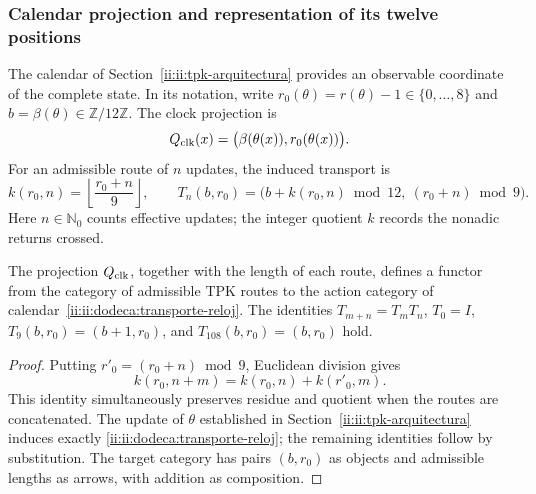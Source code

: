 \subsubsection{Calendar projection and representation of its twelve positions}
\label{ii:ii:dodeca:calendario}
The calendar of Section~\ref{ii:ii:tpk-arquitectura} provides an
observable coordinate of the complete state. In its notation, write
\(r_0(\theta)=r(\theta)-1\in\{0,\ldots,8\}\) and
\(b=\beta(\theta)\in\mathbb Z/12\mathbb Z\). The clock projection is
\[
 Q_{\rm clk}(x)=\bigl(\beta(\theta(x)),r_0(\theta(x))\bigr).
\]
For an admissible route of \(n\) updates, the induced transport is
\begin{equation}
 k(r_0,n)=\left\lfloor\frac{r_0+n}{9}\right\rfloor,
 \qquad
 T_n(b,r_0)=\bigl(b+k(r_0,n)\bmod12,\ (r_0+n)\bmod9\bigr).
 \label{ii:ii:dodeca:transporte-reloj}
\end{equation}
Here \(n\in\mathbb N_0\) counts effective updates; the integer
quotient \(k\) records the nonadic returns crossed.

\begin{proposition}
\label{ii:ii:dodeca:composicion}
The projection \(Q_{\rm clk}\), together with the length of each route, defines
a functor from the category of admissible TPK routes to the action category
of calendar~\eqref{ii:ii:dodeca:transporte-reloj}. The identities
\(T_{m+n}=T_mT_n\), \(T_0=I\),
\(T_9(b,r_0)=(b+1,r_0)\), and \(T_{108}(b,r_0)=(b,r_0)\) hold.
\end{proposition}
\begin{proof}
Putting \(r'_0=(r_0+n)\bmod9\), Euclidean division gives
\[
 k(r_0,n+m)=k(r_0,n)+k(r'_0,m).
\]
This identity simultaneously preserves residue and quotient when the
routes are concatenated. The update of \(\theta\) established in
Section~\ref{ii:ii:tpk-arquitectura} induces exactly
\eqref{ii:ii:dodeca:transporte-reloj}; the remaining identities follow
by substitution. The target category has pairs \((b,r_0)\) as
objects and admissible lengths as arrows, with addition as composition.
\end{proof}

